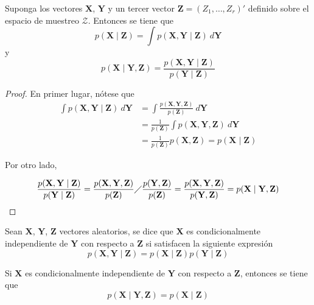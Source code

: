 \documentclass[10pt,openright]{book}\usepackage[]{graphicx}\usepackage[]{color}
\begin{document}
\begin{Res}\label{Res121}
Suponga los vectores $\mathbf{X}$, $\mathbf{Y}$ y un tercer vector $\mathbf{Z}=(Z_1,\ldots,Z_r)'$ definido sobre el espacio de muestreo  $\mathcal{Z}$. Entonces se tiene que
\begin{equation}
p(\mathbf{X} \mid \mathbf{Z})=\int p(\mathbf{X},\mathbf{Y} \mid \mathbf{Z})\ d\mathbf{Y}
\end{equation}
y
\begin{equation}
p(\mathbf{X} \mid \mathbf{Y},\mathbf{Z})=\frac{p(\mathbf{X},\mathbf{Y} \mid \mathbf{Z})}{p(\mathbf{Y} \mid \mathbf{Z})}
\end{equation}
\end{Res}

\begin{proof}
En primer lugar, nótese que
\begin{align*}
\int p(\mathbf{X},\mathbf{Y} \mid \mathbf{Z})\ d\mathbf{Y}&=
\int \frac{p(\mathbf{X},\mathbf{Y},\mathbf{Z})}{p(\mathbf{Z})}\ d\mathbf{Y}\\
&=\frac{1}{p(\mathbf{Z})} \int p(\mathbf{X},\mathbf{Y},\mathbf{Z}) \ d\mathbf{Y}\\
&=\frac{1}{p(\mathbf{Z})} p(\mathbf{X},\mathbf{Z})=p(\mathbf{X} \mid \mathbf{Z})
\end{align*}

Por otro lado,

\begin{align*}
\frac{p(\mathbf{X},\mathbf{Y} \mid \mathbf{Z})}{p(\mathbf{Y} \mid \mathbf{Z})}=
\frac{p(\mathbf{X},\mathbf{Y},\mathbf{Z})}{p(\mathbf{Z})} \diagup
\frac{p(\mathbf{Y},\mathbf{Z})}{p(\mathbf{Z})}
=\frac{p(\mathbf{X},\mathbf{Y},\mathbf{Z})}{p(\mathbf{Y},\mathbf{Z})}=p(\mathbf{X} \mid \mathbf{Y},\mathbf{Z})
\end{align*}
\end{proof}

\begin{Defi}
Sean $\mathbf{X}$, $\mathbf{Y}$, $\mathbf{Z}$ vectores aleatorios, se dice que $\mathbf{X}$ es condicionalmente independiente de $\mathbf{Y}$ con respecto a $\mathbf{Z}$ si satisfacen la siguiente expresión
\begin{equation}
p(\mathbf{X},\mathbf{Y} \mid \mathbf{Z})=p(\mathbf{X} \mid \mathbf{Z})p(\mathbf{Y} \mid \mathbf{Z})
\end{equation}
\end{Defi}

\begin{Res}\label{Res122}
Si $\mathbf{X}$ es condicionalmente independiente de $\mathbf{Y}$ con respecto a $\mathbf{Z}$, entonces se tiene que
\begin{equation}
p(\mathbf{X} \mid \mathbf{Y},\mathbf{Z})=p(\mathbf{X} \mid \mathbf{Z})
\end{equation}
\end{Res}
\end{document}
